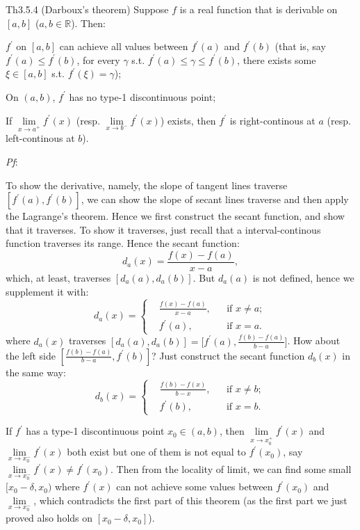 \documentclass{article}
\begin{document}
\begin{Th}{Th3.5.4 (Darboux's theorem)}
    Suppose $f$ is a real function that is derivable on $[a, b]$ ($a, b\in\mathbb{R}$). Then:
    \begin{compactenum}
        \item $f^\prime$ on $[a,b]$ can achieve all values between $f^\prime(a)$ and $f^\prime(b)$ (that is, say $f^\prime(a) \leq f^\prime(b)$, for every $\gamma$ s.t. $f^\prime(a)\leq\gamma\leq f^\prime(b)$, there exists some $\xi\in [a,b]$ s.t. $f^\prime(\xi) = \gamma$);
        \item On $(a,b)$, $f^\prime$ has no type-1 discontinuous point;
        \item If $\lim\limits_{x\to a^+} f^\prime(x)$ (resp. $\lim\limits_{x\to b^-} f^\prime(x)$) exists, then $f^\prime$ is right-continous at $a$ (resp. left-continous at $b$).
    \end{compactenum}
    \tcblower
    \textit{Pf}:
    \begin{compactenum}
        \item To show the derivative, namely, the slope of tangent lines traverse $[f^\prime(a), f^\prime(b)]$, we can show the slope of secant lines traverse and then apply the Lagrange's theorem. Hence we first construct the secant function, and show that it traverses. To show it traverses, just recall that a interval-continous function traverses its range. Hence the secant function:
        $$ d_a(x) = \frac{f(x)-f(a)}{x-a}, $$
        which, at least, traverses $[d_a(a), d_a(b)]$. But $d_a(a)$ is not defined, hence we supplement it with:
        $$ d_a(x) = \left\{
            \begin{aligned}
                &\frac{f(x)-f(a)}{x-a}, && \text{if } x\neq a;\\
                &f^\prime(a), && \text{if } x = a.
            \end{aligned}\right.
        $$
        where $d_a(x)$ traverses $[d_a(a), d_a(b)] = \Big[f^\prime(a), \frac{f(b)-f(a)}{b-a}\Big]$.
        How about the left side $[\frac{f(b)-f(a)}{b-a}, f^\prime(b)]$? Just construct the secant function $d_b(x)$ in the same way:
        $$ d_b(x) = \left\{ 
            \begin{aligned}
                &\frac{f(b)-f(x)}{b-x}, && \text{if } x\neq b;\\
                &f^\prime(b), && \text{if } x = b.
            \end{aligned}\right.
        $$
        \item If $f^\prime$ has a type-1 discontinuous point $x_0\in (a,b)$, then $\lim\limits_{x\to x_0^+} f^\prime(x)$ and $\lim\limits_{x\to x_0^-} f^\prime(x)$ both exist but one of them is not equal to $f^\prime(x_0)$, say $\lim\limits_{x\to x_0^-} f^\prime(x) \neq f^\prime(x_0)$. Then from the locality of limit, we can find some small $[x_0-\delta, x_0)$ where $f^\prime(x)$ can not achieve some values between $f^\prime(x_0)$ and $\lim\limits_{x\to x_0^-}$, which contradicts the first part of this theorem (as the first part we just proved also holds on $[x_0-\delta, x_0]$).

\end{compactenum}
\end{Th}
\end{document}
